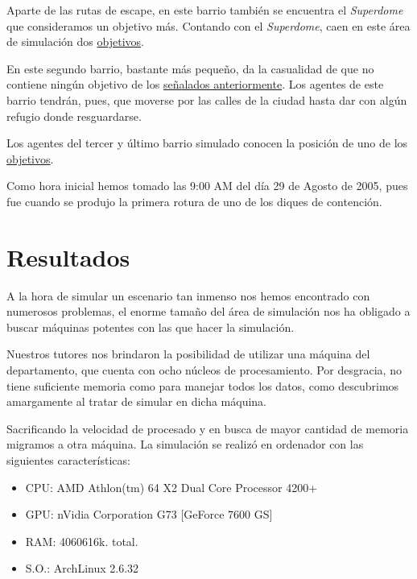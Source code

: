 Aparte de las rutas de escape, en este barrio también se encuentra el {\em
Superdome} que consideramos un objetivo más. Contando con el {\em Superdome},
caen en este área de simulación dos \hyperref[objetivos]{objetivos}.



En este segundo barrio, bastante más pequeño, da la casualidad de que no
contiene ningún objetivo de los \hyperref[objetivos]{señalados anteriormente}.
Los agentes de este barrio tendrán, pues, que moverse por las calles de la
ciudad hasta dar con algún refugio donde resguardarse.



Los agentes del tercer y último barrio simulado conocen la posición de uno de
los \hyperref[objetivos]{objetivos}.



Como hora inicial hemos tomado las 9:00 AM del día 29 de Agosto de 2005, pues
fue cuando se produjo la primera rotura de uno de los diques de
contención\cite{DeLozier}.

\section{Resultados}

A la hora de simular un escenario tan inmenso nos hemos encontrado con
numerosos problemas, el enorme tamaño del área de simulación nos ha obligado a
buscar máquinas potentes con las que hacer la simulación.

Nuestros tutores nos brindaron la posibilidad de utilizar una máquina del
departamento, que cuenta con ocho núcleos de procesamiento. Por desgracia, no
tiene suficiente memoria como para manejar todos los datos, como descubrimos
amargamente al tratar de simular en dicha máquina.

Sacrificando la velocidad de procesado y en busca de mayor cantidad de memoria
migramos a otra máquina. La simulación se realizó en ordenador con las
siguientes características:

\begin{itemize}
 \item CPU: AMD Athlon(tm) 64 X2 Dual Core Processor 4200+
 \item GPU: nVidia Corporation G73 [GeForce 7600 GS]
 \item RAM: 4060616k. total.
 \item S.O.: ArchLinux 2.6.32
\end{itemize}

